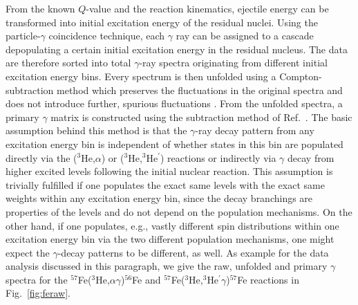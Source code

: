 \begin{multicols}{2}
From the known $Q$-value and the reaction kinematics, ejectile energy can be 
transformed into initial excitation energy of the residual nuclei. Using the 
particle-$\gamma$ coincidence technique, each $\gamma$ ray can be assigned to
a cascade depopulating a certain initial excitation energy in the residual 
nucleus. The data are therefore sorted into total $\gamma$-ray spectra 
originating from different initial excitation energy bins. Every spectrum is
then unfolded using a Compton-subtraction method which preserves the 
fluctuations in the original spectra and does not introduce further, spurious 
fluctuations \cite{GT96}. From the unfolded spectra, a primary $\gamma$ matrix
is constructed using the subtraction method of Ref.\ \cite{GR87}. The basic 
assumption behind this method is that the $\gamma$-ray decay pattern from any 
excitation energy bin is independent of whether states in this bin are 
populated directly via the ($^3$He,$\alpha$) or ($^3$He,$^3$He$^\prime$) 
reactions or indirectly via $\gamma$ decay from higher excited levels following
the initial nuclear reaction. This assumption is trivially fulfilled if one
populates the exact same levels with the exact same weights within any
excitation energy bin, since the decay branchings are properties of the levels
and do not depend on the population mechanisms. On the other hand, if one 
populates, e.g., vastly different spin distributions within one excitation 
energy bin via the two different population mechanisms, one might expect the
$\gamma$-decay patterns to be different, as well. As example for the data
analysis discussed in this paragraph, we give the raw, unfolded and primary 
$\gamma$ spectra for the $^{57}$Fe($^3$He,$\alpha\gamma$)$^{56}$Fe and 
$^{57}$Fe($^3$He,$^3$He$^\prime\gamma$)$^{57}$Fe reactions in Fig.\ 
\ref{fig:feraw}.


\end{multicols}

